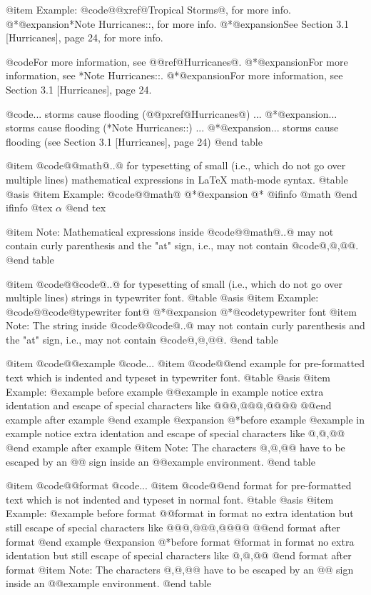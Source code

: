 {{{{@item Example:
@code{@@xref@{Tropical Storms@}, for more info.}
@*@expansion{}*Note Hurricanes::, for more info.
@*@expansion{}See Section 3.1 [Hurricanes], page 24, for more info.

@code{For more information, see @@ref@{Hurricanes@}.}
@*@expansion{}For more information, see *Note Hurricanes::.
@*@expansion{}For more information, see Section 3.1 [Hurricanes], page 24.


@code{... storms cause flooding (@@pxref@{Hurricanes@}) ...}
@*@expansion{}... storms cause flooding (*Note Hurricanes::) ...
@*@expansion{}... storms cause flooding (see Section 3.1 [Hurricanes],
page 24)
@end table

@item @code{@@math@{..@}}
for typesetting of small (i.e., which do not go over
multiple lines) mathematical expressions  in LaTeX math-mode
syntax.
@table @asis
@item Example:
@code{@@math@{\alpha@}}
@*@expansion{}
@*
@ifinfo
@math{\alpha}
@end ifinfo
@tex
$\alpha$
@end tex

@item Note:
Mathematical expressions inside @code{@@math@{..@}} may
not contain curly parenthesis and the "at" sign, i.e., may not contain
@code{@{,@},@@}.
@end table

@item @code{@@code@{..@}}
for typesetting of small (i.e., which do not go over
multiple lines) strings in typewriter font.
@table @asis
@item Example:
@code{@@code@{typewriter font@}}
@*@expansion{}
@*@code{typewriter font}
@item Note:
The string inside @code{@@code@{..@}} may
not contain curly parenthesis and the "at" sign, i.e., may not contain
@code{@{,@},@@}.
@end table

@item @code{@@example}
 @code{...}
@item @code{@@end example}
for pre-formatted text which is indented and typeset in typewriter
font.
@table @asis
@item Example:
@example
before example
@@example
in              example
notice extra identation and
escape of special characters like @@@{,@@@},@@@@
@@end example
after example
@end example
@expansion{}
@*before example
@example
in                example
notice extra identation  and
escape of special characters like @{,@},@@
@end example
after example
@item Note:
The characters @{,@},@@ have to be escaped by an @@ sign inside an
@@example environment.
@end table

@item @code{@@format}
 @code{...}
@item @code{@@end format}
for pre-formatted text which is not indented and typeset in normal
font.
@table @asis
@item Example:
@example
before format
@@format
in              format
no extra identation but still
escape of special characters like @@@{,@@@},@@@@
@@end format
after format
@end example
@expansion{}
@*before format
@format
in              format
no extra identation  but still
escape of special characters like @{,@},@@
@end format
after format
@item Note:
The characters @{,@},@@ have to be escaped by an @@ sign inside an
@@example environment.
@end table


}}}}
